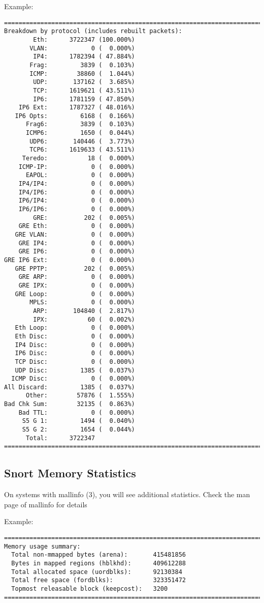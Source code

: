 \documentclass[english]{report}
\begin{document}
Example:

\begin{verbatim}
===============================================================================
Breakdown by protocol (includes rebuilt packets):
        Eth:      3722347 (100.000%)
       VLAN:            0 (  0.000%)
        IP4:      1782394 ( 47.884%)
       Frag:         3839 (  0.103%)
       ICMP:        38860 (  1.044%)
        UDP:       137162 (  3.685%)
        TCP:      1619621 ( 43.511%)
        IP6:      1781159 ( 47.850%)
    IP6 Ext:      1787327 ( 48.016%)
   IP6 Opts:         6168 (  0.166%)
      Frag6:         3839 (  0.103%)
      ICMP6:         1650 (  0.044%)
       UDP6:       140446 (  3.773%)
       TCP6:      1619633 ( 43.511%)
     Teredo:           18 (  0.000%)
    ICMP-IP:            0 (  0.000%)
      EAPOL:            0 (  0.000%)
    IP4/IP4:            0 (  0.000%)
    IP4/IP6:            0 (  0.000%)
    IP6/IP4:            0 (  0.000%)
    IP6/IP6:            0 (  0.000%)
        GRE:          202 (  0.005%)
    GRE Eth:            0 (  0.000%)
   GRE VLAN:            0 (  0.000%)
    GRE IP4:            0 (  0.000%)
    GRE IP6:            0 (  0.000%)
GRE IP6 Ext:            0 (  0.000%)
   GRE PPTP:          202 (  0.005%)
    GRE ARP:            0 (  0.000%)
    GRE IPX:            0 (  0.000%)
   GRE Loop:            0 (  0.000%)
       MPLS:            0 (  0.000%)
        ARP:       104840 (  2.817%)
        IPX:           60 (  0.002%)
   Eth Loop:            0 (  0.000%)
   Eth Disc:            0 (  0.000%)
   IP4 Disc:            0 (  0.000%)
   IP6 Disc:            0 (  0.000%)
   TCP Disc:            0 (  0.000%)
   UDP Disc:         1385 (  0.037%)
  ICMP Disc:            0 (  0.000%)
All Discard:         1385 (  0.037%)
      Other:        57876 (  1.555%)
Bad Chk Sum:        32135 (  0.863%)
    Bad TTL:            0 (  0.000%)
     S5 G 1:         1494 (  0.040%)
     S5 G 2:         1654 (  0.044%)
      Total:      3722347
===============================================================================
\end{verbatim}

\subsection{Snort Memory Statistics}
On systems with mallinfo (3), you will see additional statistics. Check the man 
page of mallinfo for details

Example:
\begin{verbatim}
===============================================================================
Memory usage summary:
  Total non-mmapped bytes (arena):       415481856
  Bytes in mapped regions (hblkhd):      409612288
  Total allocated space (uordblks):      92130384
  Total free space (fordblks):           323351472
  Topmost releasable block (keepcost):   3200
===============================================================================
\end{verbatim}
\end{document}
